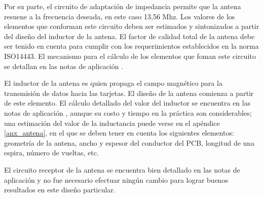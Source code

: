 \bigskip
{}

Por su parte, el circuito de adaptación de impedancia permite que la antena resuene a la frecuencia deseada, en este caso 13,56 Mhz. Los valores de los elementos que conforman este circuito deben ser estimados y sintonizados a partir del diseño del inductor de la antena.
El factor de calidad total de la antena debe ser tenido en cuenta para cumplir con los requerimientos establecidos en la norma ISO14443. 
El mecanismo para el cálculo de los elementos que foman este circuito se detallan en las notas de aplicación \cite{MRICF}.

\bigskip
{}

El inductor de la antena es quien propaga el campo magnético para la transmisión de datos hacia las tarjetas. El diseño de la antena comienza a partir de este elemento.
El cálculo detallado del valor del inductor se encuentra en las notas de aplicación \cite{ACD}, aunque su costo y tiempo en la práctica son considerables; una estimación del valor de la inductancia puede verse en el apéndice \ref{anx_antena}, en el que se deben tener en cuenta los siguientes elementos: geometría de la antena, ancho y espesor del conductor del PCB, longitud de una espira, número de vueltas, etc.

\bigskip
{} 

El circuito receptor de la antena se encuentra bien detallado en las notas de aplicación \cite{MRICF} y no fue necesario efectuar ningún cambio para lograr buenos resultados en este diseño particular. 